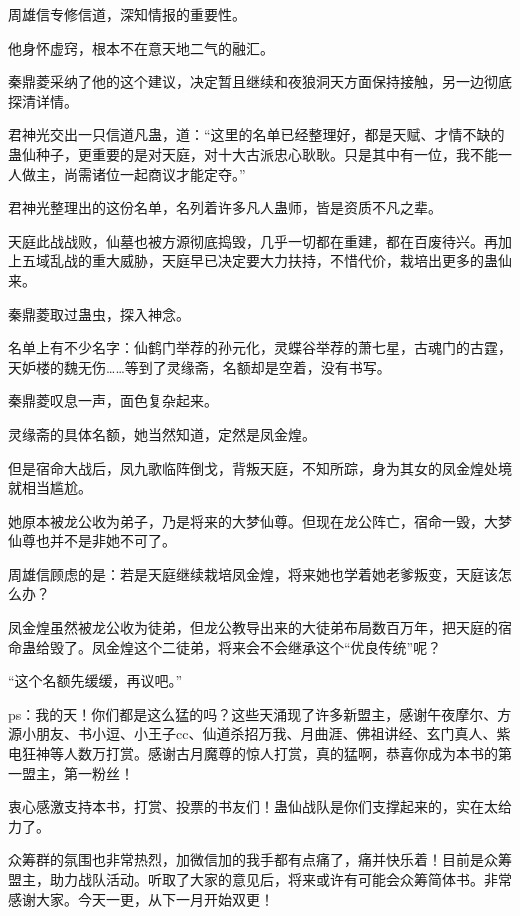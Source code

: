 \begin{this_body}
周雄信专修信道，深知情报的重要性。

他身怀虚窍，根本不在意天地二气的融汇。

秦鼎菱采纳了他的这个建议，决定暂且继续和夜狼洞天方面保持接触，另一边彻底探清详情。

君神光交出一只信道凡蛊，道：“这里的名单已经整理好，都是天赋、才情不缺的蛊仙种子，更重要的是对天庭，对十大古派忠心耿耿。只是其中有一位，我不能一人做主，尚需诸位一起商议才能定夺。”

君神光整理出的这份名单，名列着许多凡人蛊师，皆是资质不凡之辈。

天庭此战战败，仙墓也被方源彻底捣毁，几乎一切都在重建，都在百废待兴。再加上五域乱战的重大威胁，天庭早已决定要大力扶持，不惜代价，栽培出更多的蛊仙来。

秦鼎菱取过蛊虫，探入神念。

名单上有不少名字：仙鹤门举荐的孙元化，灵蝶谷举荐的萧七星，古魂门的古霆，天妒楼的魏无伤……等到了灵缘斋，名额却是空着，没有书写。

秦鼎菱叹息一声，面色复杂起来。

灵缘斋的具体名额，她当然知道，定然是凤金煌。

但是宿命大战后，凤九歌临阵倒戈，背叛天庭，不知所踪，身为其女的凤金煌处境就相当尴尬。

她原本被龙公收为弟子，乃是将来的大梦仙尊。但现在龙公阵亡，宿命一毁，大梦仙尊也并不是非她不可了。

周雄信顾虑的是：若是天庭继续栽培凤金煌，将来她也学着她老爹叛变，天庭该怎么办？

凤金煌虽然被龙公收为徒弟，但龙公教导出来的大徒弟布局数百万年，把天庭的宿命蛊给毁了。凤金煌这个二徒弟，将来会不会继承这个“优良传统”呢？

“这个名额先缓缓，再议吧。”

ps：我的天！你们都是这么猛的吗？这些天涌现了许多新盟主，感谢午夜摩尔、方源小朋友、书小逗、小王子cc、仙道杀招万我、月曲涯、佛祖讲经、玄门真人、紫电狂神等人数万打赏。感谢古月魔尊的惊人打赏，真的猛啊，恭喜你成为本书的第一盟主，第一粉丝！

衷心感激支持本书，打赏、投票的书友们！蛊仙战队是你们支撑起来的，实在太给力了。

众筹群的氛围也非常热烈，加微信加的我手都有点痛了，痛并快乐着！目前是众筹盟主，助力战队活动。听取了大家的意见后，将来或许有可能会众筹简体书。非常感谢大家。今天一更，从下一月开始双更！

\end{this_body}

